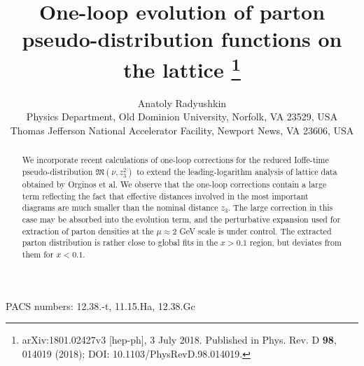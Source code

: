 \documentclass[11pt]{article}
\begin{document}
\title{One-loop evolution of parton pseudo-distribution functions on the lattice%
\thanks{arXiv:1801.02427v3 [hep-ph], 3 July 2018.
Published in Phys. Rev. D \textbf{98}, 014019 (2018);
DOI: 10.1103/PhysRevD.98.014019.}}

\author{Anatoly Radyushkin\\[6pt]
\normalsize Physics Department, Old Dominion University, Norfolk, VA 23529, USA\\
\normalsize Thomas Jefferson National Accelerator Facility, Newport News, VA 23606, USA}

\date{}

\maketitle

\begin{abstract}
\noindent
We incorporate recent calculations of one-loop corrections
for the reduced Ioffe-time pseudo-distribution ${\mathfrak M} (\nu,z_3^2)$ to
extend the leading-logarithm
analysis of lattice data obtained by Orginos et al.
We observe that the one-loop corrections contain a large term
reflecting the fact that effective distances involved in the most important diagrams
are much smaller than the nominal distance $z_3$.
The large correction in this case may be
absorbed into the evolution term, and
the perturbative expansion used for extraction of parton densities
at the $\mu \approx 2$ GeV scale
is under control.
The extracted parton distribution is rather close to
global fits in the $x>0.1$ region, but deviates from them for $x<0.1$.
\end{abstract}

\noindent
PACS numbers: 12.38.-t, 11.15.Ha, 12.38.Gc

\bigskip







\end{document}
